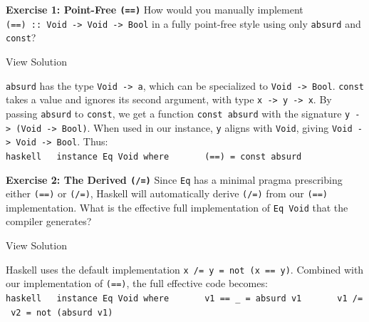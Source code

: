 \documentclass[
]{article}
\begin{document}
\textbf{Exercise 1: Point-Free \texttt{(==)}} How would you manually
implement
\texttt{(==)\ ::\ Void\ -\textgreater{}\ Void\ -\textgreater{}\ Bool} in
a fully point-free style using only \texttt{absurd} and \texttt{const}?

View Solution

\texttt{absurd} has the type \texttt{Void\ -\textgreater{}\ a}, which
can be specialized to \texttt{Void\ -\textgreater{}\ Bool}.
\texttt{const} takes a value and ignores its second argument, with type
\texttt{x\ -\textgreater{}\ y\ -\textgreater{}\ x}. By passing
\texttt{absurd} to \texttt{const}, we get a function
\texttt{const\ absurd} with the signature
\texttt{y\ -\textgreater{}\ (Void\ -\textgreater{}\ Bool)}. When used in
our instance, \texttt{y} aligns with \texttt{Void}, giving
\texttt{Void\ -\textgreater{}\ Void\ -\textgreater{}\ Bool}. Thus:
\texttt{haskell\ \ \ instance\ Eq\ Void\ where\ \ \ \ \ \ \ (==)\ =\ const\ absurd}

\textbf{Exercise 2: The Derived \texttt{(/=)}} Since \texttt{Eq} has a
minimal pragma prescribing either \texttt{(==)} or \texttt{(/=)},
Haskell will automatically derive \texttt{(/=)} from our \texttt{(==)}
implementation. What is the effective full implementation of
\texttt{Eq\ Void} that the compiler generates?

View Solution

Haskell uses the default implementation
\texttt{x\ /=\ y\ =\ not\ (x\ ==\ y)}. Combined with our implementation
of \texttt{(==)}, the full effective code becomes:
\texttt{haskell\ \ \ instance\ Eq\ Void\ where\ \ \ \ \ \ \ v1\ ==\ \_\ =\ absurd\ v1\ \ \ \ \ \ \ v1\ /=\ v2\ =\ not\ (absurd\ v1)}
\end{document}
